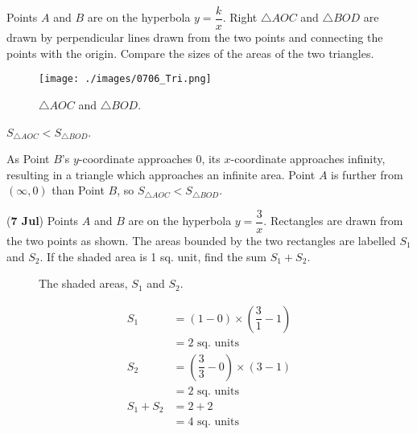 \documentclass[11pt,answers]{exam}
\renewcommand{\frac}[2]{\dfrac{#1}{#2}}
\newcommand{\qndate}[2]{(\textbf{#1 #2})}
\begin{document}
\begin{questions}
	\question Points $A$ and $B$ are on the hyperbola $y = \frac{k}{x}$. Right $\triangle AOC$
	and $\triangle BOD$ are drawn by perpendicular lines drawn from the two points and connecting
	the points with the origin. Compare the sizes of the areas of the two triangles.
	\begin{figure}[htpb]
		\centering
		\texttt{[image: ./images/0706\_Tri.png]}
		\caption{$\triangle AOC$ and $\triangle BOD$.}
		\label{fig:0706_Tri}
	\end{figure}
	\begin{solution}
		$S_{\triangle AOC} < S_{\triangle BOD}$.

		As Point $B$'s $y$-coordinate approaches 0, its $x$-coordinate approaches infinity,
		resulting in a triangle which approaches an infinite area. Point $A$ is further from
		$(\infty, 0)$ than Point $B$, so $S_{\triangle AOC} < S_{\triangle BOD}$.
	\end{solution}

	\question \qndate{7}{Jul} Points $A$ and $B$ are on the hyperbola $y = \frac{3}{x}$.
	Rectangles are drawn from the two points as shown. The areas bounded by the two
	rectangles are labelled $S_1$ and $S_2$. If the shaded area is 1 sq. unit, find
	the sum $S_1 + S_2$.
	\begin{figure}[htpb]
		\centering
		\caption{The shaded areas, $S_1$ and $S_2$.}
		\label{fig:0707_Hyper}
	\end{figure}
	\begin{solution}
		\begin{align*}
			S_1       & = \left(1 - 0\right) \times \left(\frac{3}{1}-1\right)   \\
			          & = 2 \text{ sq. units}                                    \\
			S_2       & = \left(\frac{3}{3} - 0\right) \times \left(3 - 1\right) \\
			          & = 2 \text{ sq. units}                                    \\
			S_1 + S_2 & = 2 + 2                                                  \\
			          & = 4 \text{ sq. units}
		\end{align*}
	\end{solution}
\end{questions}
\end{document}
